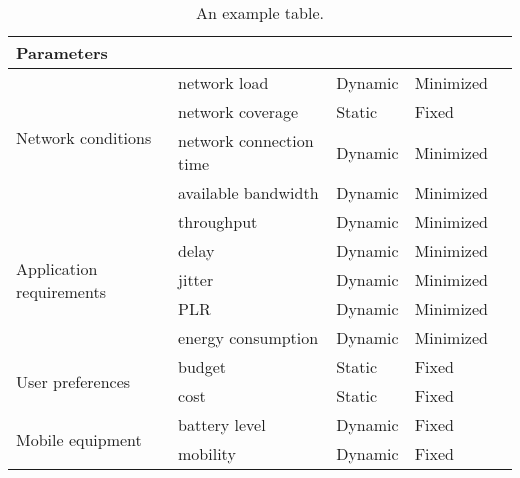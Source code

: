 \begin{table}[h!]
\begin{center}
	\begin{tabular}{|l|l|l|l|l}
	Parameters                                &                         &         &           & \\\hline
	\multirow{4}{*}{Network conditions}       & network load            & Dynamic & Minimized & \\
	\                                         & network coverage        & Static  & Fixed     & \\
	\                                         & network connection time & Dynamic & Minimized & \\
	\                                         & available bandwidth     & Dynamic & Minimized & \\\hline
	\multirow{5}{*}{Application requirements} & throughput              & Dynamic & Minimized & \\
	\                                         & delay                   & Dynamic & Minimized & \\
	\                                         & jitter                  & Dynamic & Minimized & \\
	\                                         & PLR                     & Dynamic & Minimized & \\
	\                                         & energy consumption      & Dynamic & Minimized & \\\hline
	\multirow{2}{*}{User preferences}         & budget                  & Static  & Fixed     & \\
	\                                         & cost                    & Static  & Fixed     & \\\hline
	\multirow{2}{*}{Mobile equipment}         & battery level           & Dynamic & Fixed     & \\
	\                                         & mobility                & Dynamic & Fixed     & \\\hline

	\end{tabular}
	\caption{\label{tab:Table} An example table.}
\end{center}
\end{table}



